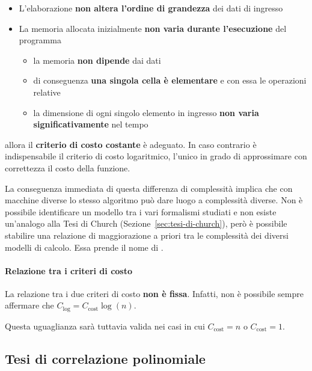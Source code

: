 \documentclass[italian, 10pt]{article}
\begin{document}
\begin{itemize}
  \item L'elaborazione \textbf{non altera l'ordine di grandezza} dei dati di ingresso
  \item La memoria allocata inizialmente \textbf{non varia durante l'esecuzione} del programma
        \begin{itemize}
          \item la memoria \textbf{non dipende} dai dati
          \item di conseguenza \textbf{una singola cella è elementare} e con essa le operazioni relative
          \item la dimensione di ogni singolo elemento in ingresso \textbf{non varia significativamente} nel tempo
        \end{itemize}
\end{itemize}

allora il \textbf{criterio di costo costante} è adeguato.
In caso contrario è indispensabile il criterio di costo logaritmico, l'unico in grado di approssimare con correttezza il costo della funzione.

\bigskip
La conseguenza immediata di questa differenza di complessità implica che con macchine diverse lo stesso algoritmo può dare luogo a complessità diverse.
Non è possibile identificare un modello  tra i vari formalismi studiati e non esiste un'analogo alla Tesi di Church (Sezione~\ref{sec:tesi-di-church}), però è possibile stabilire una relazione di maggiorazione a priori tra le complessità dei diversi modelli di calcolo.
Essa prende il nome di \textit{}.

\paragraph{Relazione tra i criteri di costo}

La relazione tra i due criteri di costo \textbf{non è fissa}.
Infatti, non è possibile sempre affermare che \(C_{\text{log}} = C_{\text{cost}} \log{(n)}\).

Questa uguaglianza sarà tuttavia valida nei casi in cui \(C_{\text{cost}} = n\) o \(C_{\text{cost}} = 1\).


\subsection{Tesi di correlazione polinomiale}
\label{sec:tesi-correlazione-polinomiale}
\end{document}
